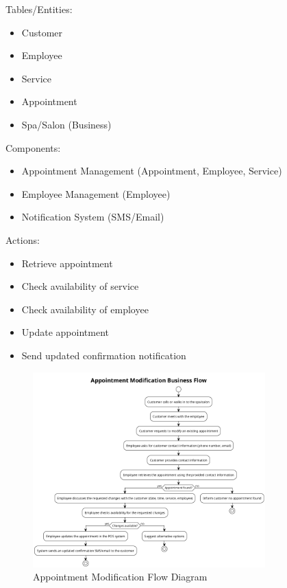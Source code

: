 \documentclass[]{VUMIFTemplateClass}
\begin{document}
Tables/Entities:
\begin{itemize}
    \setlength{\itemsep}{2pt}
    \setlength{\parskip}{0pt}
    \setlength{\parsep}{0pt}
    \item Customer
    \item Employee
    \item Service
    \item Appointment
    \item Spa/Salon (Business)
\end{itemize}

Components:
\begin{itemize}
    \setlength{\itemsep}{2pt}
    \setlength{\parskip}{0pt}
    \setlength{\parsep}{0pt}
    \item Appointment Management (Appointment, Employee, Service)
    \item Employee Management (Employee)
    \item Notification System (SMS/Email)
\end{itemize}

Actions:
\begin{itemize}
    \setlength{\itemsep}{2pt}
    \setlength{\parskip}{0pt}
    \setlength{\parsep}{0pt}
    \item Retrieve appointment
    \item Check availability of service
    \item Check availability of employee
    \item Update appointment
    \item Send updated confirmation notification
\end{itemize}

\begin{figure}[H]
    \centering
    \includegraphics[width=0.8\textwidth]{images/diagrams/services/appointment_modification_flow.png}
    \caption{Appointment Modification Flow Diagram}
    \label{fig:appointment_modification_flow}
\end{figure}
\end{document}
